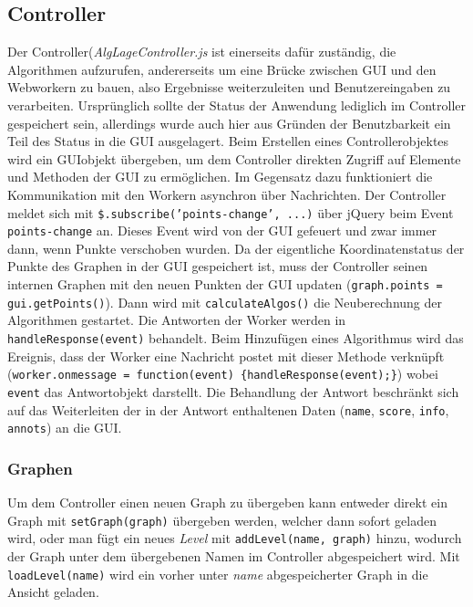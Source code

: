 \documentclass[a4paper,twocolumn]{scrartcl}
\begin{document}
\subsection{Controller}
Der Controller(\emph{AlgLageController.js} ist einerseits dafür zuständig, die Algorithmen aufzurufen, andererseits um eine Brücke zwischen GUI und den Webworkern zu bauen, also Ergebnisse weiterzuleiten und Benutzereingaben zu verarbeiten. 
Ursprünglich sollte der Status der Anwendung lediglich im Controller gespeichert sein, allerdings wurde auch hier aus Gründen der Benutzbarkeit ein Teil des Status in die GUI ausgelagert.
Beim Erstellen eines Controllerobjektes wird ein GUIobjekt übergeben, um dem Controller direkten Zugriff auf Elemente und Methoden der GUI zu ermöglichen.
Im Gegensatz dazu funktioniert die Kommunikation mit den Workern asynchron über Nachrichten. Der Controller meldet sich mit \texttt{\$.subscribe('points-change', ...)} über jQuery beim Event \texttt{points-change} an. Dieses Event wird von der GUI gefeuert und zwar immer dann, wenn Punkte verschoben wurden. Da der eigentliche Koordinatenstatus der Punkte des Graphen in der GUI gespeichert ist, muss der Controller seinen internen Graphen mit den neuen Punkten der GUI updaten (\texttt{graph.points = gui.getPoints()}). Dann wird mit \texttt{calculateAlgos()} die Neuberechnung der Algorithmen gestartet.
Die Antworten der Worker werden in \texttt{handleResponse(event)} behandelt. Beim Hinzufügen eines Algorithmus wird das Ereignis, dass der Worker eine Nachricht postet mit dieser Methode verknüpft (\texttt{worker.onmessage = function(event) \{handleResponse(event);\}}) wobei \texttt{event} das Antwortobjekt darstellt.
Die Behandlung der Antwort beschränkt sich auf das Weiterleiten der in der Antwort enthaltenen Daten (\texttt{name}, \texttt{score}, \texttt{info}, \texttt{annots}) an die GUI.

\subsubsection{Graphen}
Um dem Controller einen neuen Graph zu übergeben kann entweder direkt ein Graph mit \texttt{setGraph(graph)} übergeben werden, welcher dann sofort geladen wird, oder man fügt ein neues \emph{Level} mit \texttt{addLevel(name, graph)} hinzu, wodurch der Graph unter dem übergebenen Namen im Controller abgespeichert wird. Mit \texttt{loadLevel(name)} wird ein vorher unter \emph{name} abgespeicherter Graph in die Ansicht geladen.
\end{document}
